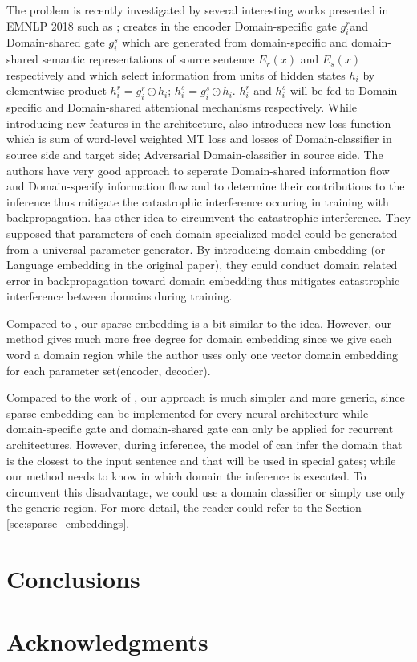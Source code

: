 \documentclass[11pt,a4paper]{article}
\newcommand{\fyTodo}[1]{\Todo[FY:]{\textcolor{orange}{#1}}}
\begin{document}
The problem is recently investigated by several interesting works presented in EMNLP 2018 such as \cite{Platanios18contextual}; \cite{Zeng18multidomain} creates in the encoder Domain-specific gate $g^r_i$and Domain-shared gate $g^s_i$ which are generated from domain-specific and domain-shared semantic representations of source sentence $E_r(x)$ and $E_s(x)$ respectively and which select information from units of hidden states $h_i$ by elementwise product $h^r_i = g^r_i \odot h_i$; $h^s_i = g^s_i \odot h_i$. $h^r_i$ and $h^s_i$ will be fed to Domain-specific and Domain-shared attentional mechanisms respectively. While introducing new features in the architecture, \cite{Zeng18multidomain} also introduces new loss function which is sum of word-level weighted MT loss and losses of Domain-classifier in source side and target side; Adversarial Domain-classifier in source side. The authors have very good approach to seperate Domain-shared information flow and Domain-specify information flow and to determine their contributions to the inference thus mitigate the catastrophic interference occuring in training with backpropagation. \cite{Platanios18contextual} has other idea to circumvent the catastrophic interference. They supposed that parameters of each domain specialized model could be generated from a universal parameter-generator. By introducing domain embedding (or Language embedding in the original paper), they could conduct domain related error in backpropagation toward domain embedding thus mitigates catastrophic interference between domains during training.

Compared to \cite{Platanios18contextual}, our sparse embedding is a bit similar to the idea. However, our method gives much more free degree for domain embedding since we give each word a domain region while the author uses only one vector domain embedding for each parameter set(encoder, decoder).

Compared to the work of \cite{Zeng18multidomain}, our approach is much simpler and
more generic, since sparse embedding can be implemented for every neural architecture while domain-specific gate and domain-shared gate can only be applied for recurrent architectures. However, during inference, the model of \cite{Zeng18multidomain} can infer the domain that is the closest to the input sentence and that will be used in special gates; while our method needs to know in which domain the inference is executed. To circumvent this disadvantage, we could use a domain classifier or simply use only the generic region. For more detail, the reader could refer to the Section \ref{sec:sparse_embeddings}.

\section{Conclusions}
\fyTodo{natural continuations: bayesian version ? linear combination of specialized engines ? go beyond words; learn the projection matrix at the word level; other ?}

\section*{Acknowledgments}
\fyTodo{Homegenize refs - urls, addresses, etc}


\end{document}
